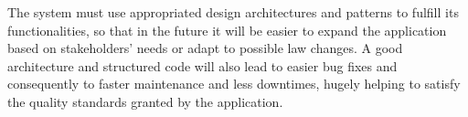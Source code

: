 The system must use appropriated design architectures and patterns to fulfill its functionalities, so that in the future it will be easier to expand the application based on stakeholders' needs or adapt to possible law changes. A good architecture and structured code will also lead to easier bug fixes and consequently to faster maintenance and less downtimes, hugely helping to satisfy the quality standards granted by the application.